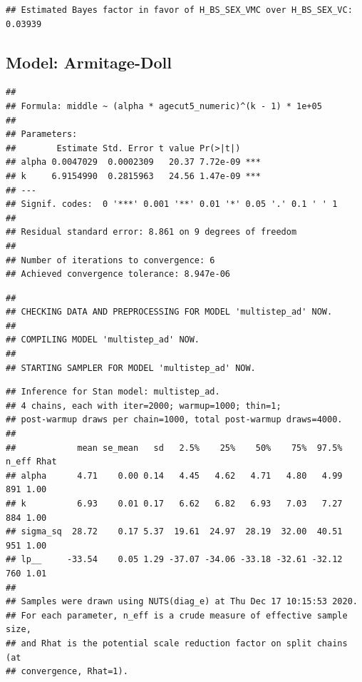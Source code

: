 \documentclass[
]{article}
\begin{document}
\begin{verbatim}
## Estimated Bayes factor in favor of H_BS_SEX_VMC over H_BS_SEX_VC: 0.03939
\end{verbatim}

\hypertarget{model-armitage-doll}{%
\subsection{Model: Armitage-Doll}\label{model-armitage-doll}}

\begin{verbatim}
## 
## Formula: middle ~ (alpha * agecut5_numeric)^(k - 1) * 1e+05
## 
## Parameters:
##        Estimate Std. Error t value Pr(>|t|)    
## alpha 0.0047029  0.0002309   20.37 7.72e-09 ***
## k     6.9154990  0.2815963   24.56 1.47e-09 ***
## ---
## Signif. codes:  0 '***' 0.001 '**' 0.01 '*' 0.05 '.' 0.1 ' ' 1
## 
## Residual standard error: 8.861 on 9 degrees of freedom
## 
## Number of iterations to convergence: 6 
## Achieved convergence tolerance: 8.947e-06
\end{verbatim}

\begin{verbatim}
## 
## CHECKING DATA AND PREPROCESSING FOR MODEL 'multistep_ad' NOW.
## 
## COMPILING MODEL 'multistep_ad' NOW.
## 
## STARTING SAMPLER FOR MODEL 'multistep_ad' NOW.
\end{verbatim}

\begin{verbatim}
## Inference for Stan model: multistep_ad.
## 4 chains, each with iter=2000; warmup=1000; thin=1; 
## post-warmup draws per chain=1000, total post-warmup draws=4000.
## 
##            mean se_mean   sd   2.5%    25%    50%    75%  97.5% n_eff Rhat
## alpha      4.71    0.00 0.14   4.45   4.62   4.71   4.80   4.99   891 1.00
## k          6.93    0.01 0.17   6.62   6.82   6.93   7.03   7.27   884 1.00
## sigma_sq  28.72    0.17 5.37  19.61  24.97  28.19  32.00  40.51   951 1.00
## lp__     -33.54    0.05 1.29 -37.07 -34.06 -33.18 -32.61 -32.12   760 1.01
## 
## Samples were drawn using NUTS(diag_e) at Thu Dec 17 10:15:53 2020.
## For each parameter, n_eff is a crude measure of effective sample size,
## and Rhat is the potential scale reduction factor on split chains (at 
## convergence, Rhat=1).
\end{verbatim}
\end{document}
